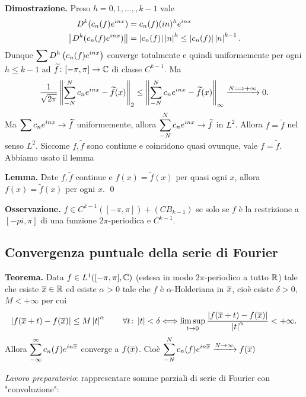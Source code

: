 \textbf{Dimostrazione.} Preso $h=0,1,\ldots,,k-1$ vale
\begin{align*}
D^k (c_n(f) e^{inx}) & = c_n(f) (in)^h e^{inx} \\
\left\lVert D^k (c_n(f) e^{inx}) \right\rVert & = \left| c_n(f) \right| \left| n \right|^h \leq \left| c_n(f) \right| \left| n \right|^{k-1}.
\end{align*}
Dunque $\displaystyle \sum D^h \left( c_n(f) e^{inx} \right)$ converge totalmente e quindi uniformemente per ogni $h \leq k-1$ ad $\widetilde{f} \colon  [-\pi,\pi] \to \mathbb C$ di classe $C^{k-1}$.
Ma
%
$$
\frac{1}{\sqrt{2\pi} } \left\lVert \sum_{-N}^N c_n e^{inx} - \widetilde{f}(x) \right\rVert_2
\leq \left\lVert \sum_{-N}^N c_n e^{inx} - \widetilde{f}(x) \right\rVert_\infty \xrightarrow{N \Longrightarrow +\infty} 0.
$$
%
Ma $\displaystyle \sum c_n e^{inx} \to \widetilde{f}$ uniformemente, allora $\displaystyle \sum_{-N}^N c_n e^{inx} \to \widetilde{f}$ in $L^2$.
Allora $f = \tilde{f}$ nel senso $L^2$. Siccome $f,\tilde{f}$ sono continue e coincidono quasi ovunque, vale $f = \tilde{f}$.
Abbiamo usato il lemma

\vs

\textbf{Lemma.} Date $f,\tilde{f}$ continue e $f(x) = \tilde{f}(x)$ per quasi ogni $x$, allora  $f(x) = \tilde{f}(x)$ per ogni $x$.
\qed

\vs

\textbf{Osservazione.} $f \in C^{k-1}([-\pi,\pi]) + (CB_{k-1})$ se solo se $f $ è la restrizione a $[-pi,\pi]$ di una funzione $2\pi$-periodica e $C^{k-1}$.


\subsection{Convergenza puntuale della serie di Fourier}

\textbf{Teorema.} Data $f \in L^1([-\pi,\pi], \mathbb C) $ (estesa in modo $2\pi$-periodico a tutto $\mathbb R$) tale che esiste $\overline{x} \in \mathbb R$ ed esiste $\alpha > 0$ tale che $f$ è $\alpha$-Holderiana in $\overline{x}$, cioè esiste $\delta > 0 $, $M < +\infty$ per cui
%
$$
\left| f(\overline{x} +t) - f(\overline{x}) \right| \leq M \left| t \right|^\alpha \qquad \forall t \colon \left| t \right| < \delta \Longleftrightarrow \limsup_{t \to 0} \frac{\left| f(\overline{x} + t) - f(\overline{x}) \right|}{\left| t \right|^\alpha } < +\infty.
$$
%
Allora $\displaystyle \sum_{-\infty}^\infty c_n(f) e^{in\overline{x}}$ converge a $f(\overline{x})$.
Cioè $\displaystyle \sum_{-N}^N c_n(f) e^{in\overline{x}}\xrightarrow{N \to \infty} f(\overline{x})$ 

\textit{Lavoro preparatorio}: rappresentare somme parziali di serie di Fourier con "convoluzione":

